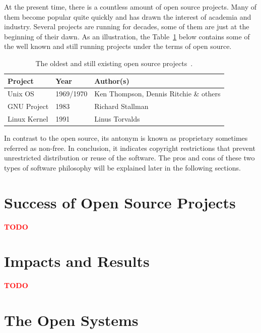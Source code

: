 \documentclass[11pt,a4paper]{article}
\newcommand{\TODO}{\textbf{\textcolor{red}{TODO}}} %
\theoremstyle{definition}
\begin{document}
    At the present time, there is a countless amount of open source projects. Many of them become popular quite quickly and has drawn the interest of academia and industry. Several projects are running for decades, some of them are just at the beginning of their dawn. As an illustration, the Table~\ref{fig:open-source-projects} below contains some of the well known and still running projects under the terms of open source.\\

    \begin{table}[H]
        \begin{center}
            \begin{tabular}{l|l|l}
                Project      & Year      & Author(s)                              \\
                \hline
                Unix OS      & 1969/1970 & Ken Thompson, Dennis Ritchie \& others \\
                GNU Project  & 1983      & Richard Stallman                       \\
                Linux Kernel & 1991      & Linus Torvalds                         \\[-5mm]
            \end{tabular}
        \end{center}
        \caption{The oldest and still existing open source projects~\cite{SD:linux-kernel, WP:gnu-proj-init, DLACM:history-of-unix}.}
        \label{fig:open-source-projects}
    \end{table}

    In contrast to the open source, its antonym is known as proprietary sometimes referred as non-free. In conclusion, it indicates copyright restrictions that prevent unrestricted distribution or reuse of the software. The pros and cons of these two types of software philosophy will be explained later in the following sections.

\section{Success of Open Source Projects}

    \TODO

\section{Impacts and Results}

    \TODO

\section{The Open Systems}
\end{document}
